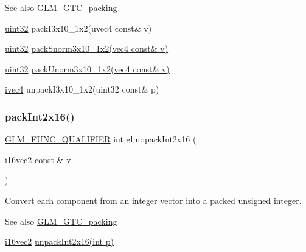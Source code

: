 \begin{DoxySeeAlso}{See also}
\hyperlink{group__gtc__packing}{G\+L\+M\+\_\+\+G\+T\+C\+\_\+packing} 

\hyperlink{group__gtc__type__precision_ga202b6a53c105fcb7e531f9b443518451}{uint32} pack\+I3x10\+\_\+1x2(uvec4 const\& v) 

\hyperlink{group__gtc__type__precision_ga202b6a53c105fcb7e531f9b443518451}{uint32} \hyperlink{group__gtc__packing_ga0d4157cec37c0312216a7be1cc92df54}{pack\+Snorm3x10\+\_\+1x2(vec4 const\& v)} 

\hyperlink{group__gtc__type__precision_ga202b6a53c105fcb7e531f9b443518451}{uint32} \hyperlink{group__gtc__packing_ga2cf2d11b40bd48639110456fd74c2e33}{pack\+Unorm3x10\+\_\+1x2(vec4 const\& v)} 

\hyperlink{group__core__types_gaa4560ddc50320ea8f8a70d5c9c249fea}{ivec4} unpack\+I3x10\+\_\+1x2(uint32 const\& p) 
\end{DoxySeeAlso}
\mbox{\label{group__gtc__packing_ga0182984c14b2b59fd74e72af3f3b4bb9}} 
\subsubsection{\texorpdfstring{pack\+Int2x16()}{packInt2x16()}}
{\footnotesize\ttfamily \hyperlink{setup_8hpp_a33fdea6f91c5f834105f7415e2a64407}{G\+L\+M\+\_\+\+F\+U\+N\+C\+\_\+\+Q\+U\+A\+L\+I\+F\+I\+ER} int glm\+::pack\+Int2x16 (\begin{DoxyParamCaption}\item[{\hyperlink{group__gtc__type__precision_gad912fd04abb876a5b806118ec6e0f283}{i16vec2} const \&}]{v }\end{DoxyParamCaption})}

Convert each component from an integer vector into a packed unsigned integer.

\begin{DoxySeeAlso}{See also}
\hyperlink{group__gtc__packing}{G\+L\+M\+\_\+\+G\+T\+C\+\_\+packing} 

\hyperlink{group__gtc__type__precision_gad912fd04abb876a5b806118ec6e0f283}{i16vec2} \hyperlink{group__gtc__packing_ga639c216b452fc364b32c15eb5b8b6a87}{unpack\+Int2x16(int p)} 
\end{DoxySeeAlso}
\mbox{\label{group__gtc__packing_ga1d6c24ff4f2b198eb2c4a2e4dcf7c336}} 
